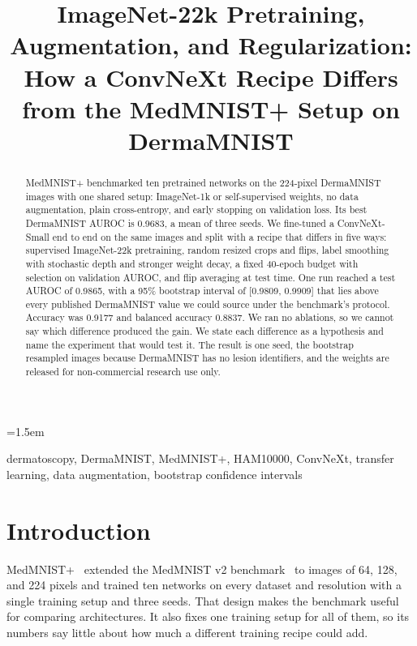 \documentclass[conference]{IEEEtran}
\begin{document}
\emergencystretch=1.5em

\title{ImageNet-22k Pretraining, Augmentation, and Regularization: How a ConvNeXt Recipe Differs from the MedMNIST+ Setup on DermaMNIST}

\author{
\and
{}
}

\maketitle

\begin{abstract}
MedMNIST+ benchmarked ten pretrained networks on the 224-pixel DermaMNIST images with one shared setup: ImageNet-1k or self-supervised weights, no data augmentation, plain cross-entropy, and early stopping on validation loss. Its best DermaMNIST AUROC is 0.9683, a mean of three seeds. We fine-tuned a ConvNeXt-Small end to end on the same images and split with a recipe that differs in five ways: supervised ImageNet-22k pretraining, random resized crops and flips, label smoothing with stochastic depth and stronger weight decay, a fixed 40-epoch budget with selection on validation AUROC, and flip averaging at test time. One run reached a test AUROC of 0.9865, with a 95\% bootstrap interval of [0.9809, 0.9909] that lies above every published DermaMNIST value we could source under the benchmark's protocol. Accuracy was 0.9177 and balanced accuracy 0.8837. We ran no ablations, so we cannot say which difference produced the gain. We state each difference as a hypothesis and name the experiment that would test it. The result is one seed, the bootstrap resampled images because DermaMNIST has no lesion identifiers, and the weights are released for non-commercial research use only.
\end{abstract}

\begin{IEEEkeywords}
dermatoscopy, DermaMNIST, MedMNIST+, HAM10000, ConvNeXt, transfer learning, data augmentation, bootstrap confidence intervals
\end{IEEEkeywords}

\section{Introduction}

MedMNIST+~\cite{doerrich2025medmnistplus} extended the MedMNIST v2 benchmark~\cite{yang2023medmnistv2} to images of 64, 128, and 224 pixels and trained ten networks on every dataset and resolution with a single training setup and three seeds. That design makes the benchmark useful for comparing architectures. It also fixes one training setup for all of them, so its numbers say little about how much a different training recipe could add.
\end{document}
